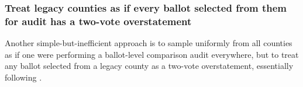 \documentclass[runningheads]{llncs}
\begin{document}
%

\subsubsection{Treat legacy counties as if every ballot selected from them for audit has a two-vote overstatement}\label{sec:two-vote-over}
Another simple-but-inefficient approach is to sample uniformly from all counties as if one
were performing a ballot-level comparison audit everywhere,  but to 
treat any ballot
selected from a legacy county as a two-vote overstatement, essentially following \cite{banuelosStark12}.
\end{document}
